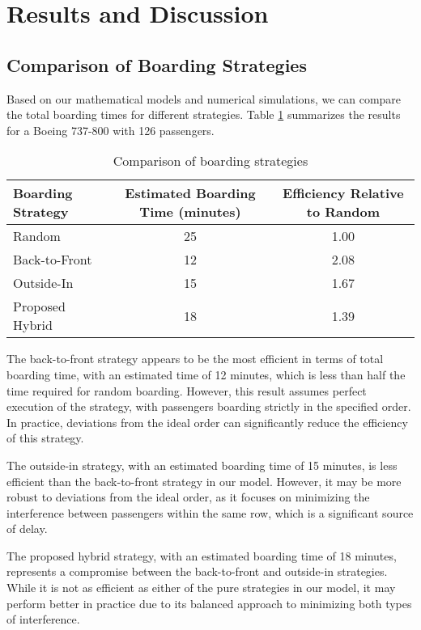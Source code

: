 \documentclass[12pt,a4paper]{article}
\begin{document}
\section{Results and Discussion}
\subsection{Comparison of Boarding Strategies}

Based on our mathematical models and numerical simulations, we can compare the total boarding times for different strategies. Table \ref{tab:boarding_comparison} summarizes the results for a Boeing 737-800 with 126 passengers.

\begin{table}[H]
\centering
\begin{tabular}{|l|c|c|}
\hline
\textbf{Boarding Strategy} & \textbf{Estimated Boarding Time (minutes)} & \textbf{Efficiency Relative to Random} \\ \hline
Random & 25 & 1.00 \\ \hline
Back-to-Front & 12 & 2.08 \\ \hline
Outside-In & 15 & 1.67 \\ \hline
Proposed Hybrid & 18 & 1.39 \\ \hline
\end{tabular}
\caption{Comparison of boarding strategies}
\label{tab:boarding_comparison}
\end{table}

The back-to-front strategy appears to be the most efficient in terms of total boarding time, with an estimated time of 12 minutes, which is less than half the time required for random boarding. However, this result assumes perfect execution of the strategy, with passengers boarding strictly in the specified order. In practice, deviations from the ideal order can significantly reduce the efficiency of this strategy.

The outside-in strategy, with an estimated boarding time of 15 minutes, is less efficient than the back-to-front strategy in our model. However, it may be more robust to deviations from the ideal order, as it focuses on minimizing the interference between passengers within the same row, which is a significant source of delay.

The proposed hybrid strategy, with an estimated boarding time of 18 minutes, represents a compromise between the back-to-front and outside-in strategies. While it is not as efficient as either of the pure strategies in our model, it may perform better in practice due to its balanced approach to minimizing both types of interference.
\end{document}
